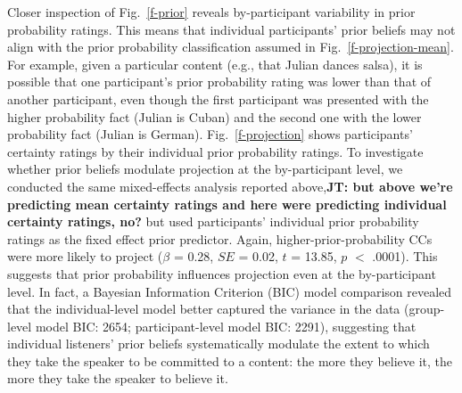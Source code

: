 \documentclass[11pt,fleqn]{article}
\newcommand{\jt}[1]{\textbf{\color{blue}JT: #1}}
\newcommand{\figref}[1]{Fig.~\ref{#1}}
\newcommand{\6}{\mbox{$[\hspace*{-.6mm}[$}}
\newcommand{\9}{\mbox{$]\hspace*{-.6mm}]$}}
\begin{document}
Closer inspection of  \figref{f-prior} reveals by-participant variability in prior probability ratings. This means that individual participants' prior beliefs may not align with the prior probability classification assumed in  \figref{f-projection-mean}. For example, given a particular content (e.g., that Julian dances salsa), it is possible that one participant's prior probability rating was lower than that of another participant, even though the first participant was presented with the higher probability fact (Julian is Cuban) and the second one with the lower probability fact (Julian is German). \figref{f-projection} shows participants' certainty ratings by their individual prior probability ratings. %
To investigate whether prior beliefs modulate projection at the by-participant level,  we conducted the same mixed-effects analysis reported above,\jt{but above we're predicting mean certainty ratings and here were predicting individual certainty ratings, no?} but used participants' individual prior probability ratings as the fixed effect prior predictor. Again, higher-prior-probability CCs were more likely to project ($\beta$ = 0.28, $SE$ = 0.02, $t$ = 13.85, $p$ $<$ .0001). This  suggests that prior probability influences projection even at the by-participant level. In fact, a Bayesian Information Criterion (BIC) model comparison  revealed that the individual-level model better captured the variance in the data (group-level model BIC: 2654; participant-level model BIC: 2291), suggesting that individual listeners' prior beliefs systematically modulate the extent to which they take the speaker to be committed to a content: the more they believe it, the more they take the speaker to believe it.
\end{document}
